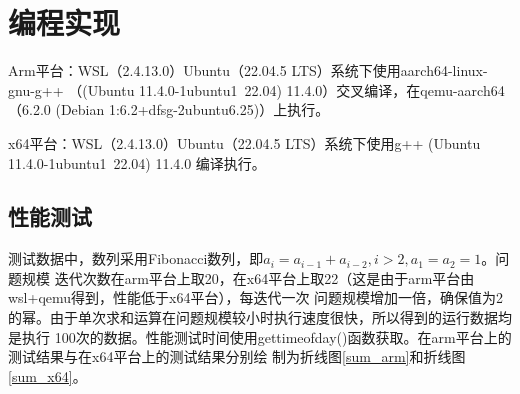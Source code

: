 \documentclass[12pt, a4paper, oneside]{ctexart}
\begin{document}
\section{编程实现}
Arm平台：WSL（2.4.13.0）Ubuntu（22.04.5 LTS）系统下使用aarch64-linux-gnu-g++
（(Ubuntu 11.4.0-1ubuntu1~22.04) 11.4.0）交叉编译，在qemu-aarch64
（6.2.0 (Debian 1:6.2+dfsg-2ubuntu6.25)）上执行。

x64平台：WSL（2.4.13.0）Ubuntu（22.04.5 LTS）系统下使用g++ (Ubuntu 11.4.0-1ubuntu1~22.04) 11.4.0
编译执行。
\subsection{性能测试}
测试数据中，数列采用Fibonacci数列，即$a_i = a_{i - 1} + a_{i - 2}, i > 2, a_1 = a_2 = 1$。问题规模
迭代次数在arm平台上取20，在x64平台上取22（这是由于arm平台由wsl+qemu得到，性能低于x64平台），每迭代一次
问题规模增加一倍，确保值为2的幂。由于单次求和运算在问题规模较小时执行速度很快，所以得到的运行数据均是执行
100次的数据。性能测试时间使用gettimeofday()函数获取。在arm平台上的测试结果与在x64平台上的测试结果分别绘
制为折线图\ref{sum_arm}和折线图\ref{sum_x64}。
\end{document}
